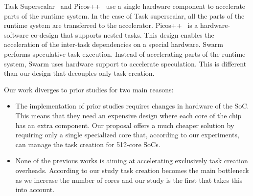 Task Superscalar~\cite{TaskSS} and Picos++~\cite{Xubin} use a single hardware component to accelerate parts of the runtime system.
In the case of Task superscalar, all the parts of the runtime system are transferred to the accelerator.
Picos++~\cite{Xubin} is a hardware-software co-design that supports nested tasks. 
This design enables the acceleration of the inter-task dependencies on a special hardware.
Swarm~\cite{Swarm} performs speculative task execution. 
Instead of accelerating parts of the runtime system, Swarm uses hardware support to accelerate speculation.
This is different than our design that decouples only task creation.

Our work diverges to prior studies for two main reasons:
\begin{itemize}
\item The implementation of prior studies requires changes in hardware of the SoC.
This means that they need an expensive design where each core of the chip has an extra component.
Our proposal offers a much cheaper solution by requiring only a single specialized core that, according to our experiments, can manage the task creation for 512-core SoCs.
\item None of the previous works is aiming at accelerating exclusively task creation overheads. 
According to our study task creation becomes the main bottleneck as we increase the number of cores and our study is the first that takes this into account.
\end{itemize}


